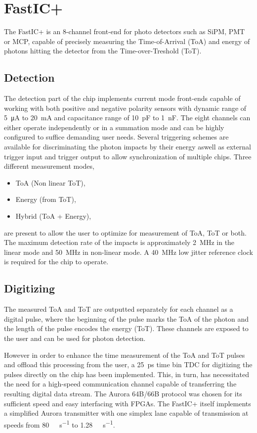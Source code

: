 \section{FastIC+}
The FastIC+ is an 8-channel front-end for photo detectors such as SiPM, PMT or MCP, capable of precisely
measuring the Time-of-Arrival (ToA) and energy of photons hitting the detector from the Time-over-Treshold (ToT). 

\subsection{Detection}
\label{sec:fastic:detection}
The detection part of the chip implements current mode front-ends capable of working with both positive and negative polarity sensors with dynamic range of \SI{5}{\micro\ampere} to \SI{20}{\milli\ampere} and capacitance range of \SI{10}{\pico\farad} to \SI{1}{\nano\farad}. The eight channels can either operate independently or in a summation mode and can be highly configured to suffice demanding user needs. Several triggering schemes are available for discriminating the photon impacts by their energy aswell as external trigger input and trigger output to allow synchronization of multiple chips. Three different measurement modes, 
\begin{itemize}
    \item ToA (Non linear ToT),
    \item Energy (from ToT),
    \item Hybrid (ToA + Energy),
\end{itemize}
are present to allow the user to optimize for measurement of ToA, ToT or both. The maximum detection rate of the impacts is approximately \SI{2}{\mega\hertz} in the linear mode and \SI{50}{\mega\hertz} in non-linear mode. A \SI{40}{\mega\hertz} low jitter reference clock is required for the chip to operate.


\subsection{Digitizing}
The measured ToA and ToT are outputted separately for each channel as a digital pulse, where the beginning of the pulse marks the ToA of the photon and the length of the pulse encodes the energy (ToT). These channels are exposed to the user and can be used for photon detection.

However in order to enhance the time measurement of the ToA and ToT pulses and offload this processing from the user, a \SI{25}{\pico\second} time bin TDC for digitizing the pulses directly on the chip has been implemented. This, in turn, has necessitated the need for a high-speed communication channel capable of transferring the resulting digital data stream. The Aurora 64B/66B protocol was chosen for its sufficient speed and easy interfacing with FPGAs. The FastIC+ itself implements a simplified Aurora transmitter with one simplex lane capable of transmission at speeds from \SI{80}{\mega\bit\per\second} to \SI{1.28}{\giga\bit\per\second}.

